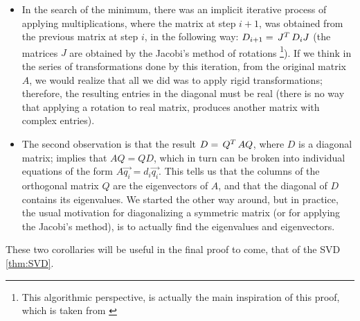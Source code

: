 \begin{itemize}
\item In the search of the minimum, there was an implicit iterative
  process of applying multiplications, where the matrix at step $i+1$,
  was obtained from the previous matrix at step $i$, in the following
  way: $D_{i+1} = \,{J}^{T}\,D_iJ$ (the matrices $J$ are obtained by the
  Jacobi's method of rotations \footnote{This algorithmic perspective,
  is actually the main inspiration of this proof, which is taken from
  \cite{wilf81}}). If we think in the series of 
  transformations done by this iteration, from the original matrix
  $A$, we would realize that all we did was to apply rigid
  transformations; therefore, the resulting entries in the diagonal
  must be real (there is no way that applying a rotation to real
  matrix, produces another matrix with complex entries). \\

\item The second observation is that the result $D = \,{Q}^{T}\,AQ$,
  where $D$ is a diagonal matrix; implies that $AQ = QD$, which in
  turn can be broken into individual equations of the form $A\vec{q_i}
  = d_i\vec{q_i}$. This tells us that the columns of the orthogonal
  matrix $Q$ are the eigenvectors of $A$, and that the diagonal of $D$
  contains its eigenvalues. We started the other way around, but in
  practice, the usual motivation for diagonalizing a symmetric matrix
  (or for applying the Jacobi's method), is to actually find the
  eigenvalues and eigenvectors. 
\end{itemize}
\hfill

These two corollaries will be useful in the final proof to come, that
of the SVD \cref{thm:SVD}. 
